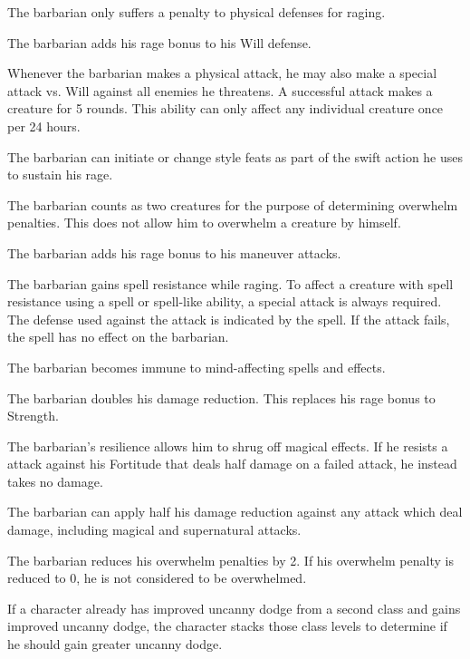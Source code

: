  The barbarian only suffers a  penalty to physical defenses for raging.

 The barbarian adds his rage bonus to his Will defense.

 Whenever the barbarian makes a physical attack, he may also make a special attack vs. Will against all enemies he threatens. A successful attack makes a creature \shaken for 5 rounds. This ability can only affect any individual creature once per 24 hours.

 The barbarian can initiate or change style feats as part of the swift action he uses to sustain his rage.

 The barbarian counts as two creatures for the purpose of determining overwhelm penalties. This does not allow him to overwhelm a creature by himself.

 The barbarian adds his rage bonus to his maneuver attacks.

 The barbarian gains spell resistance while raging. To affect a creature with spell resistance using a spell or spell-like ability, a special attack is always required. The defense used against the attack is indicated by the spell. If the attack fails, the spell has no effect on the barbarian.

 The barbarian becomes immune to mind-affecting spells and effects.

 The barbarian doubles his damage reduction. This replaces his rage bonus to Strength.

 The barbarian's resilience allows him to shrug off magical effects. If he resists a attack against his Fortitude that deals half damage on a failed attack, he instead takes no damage.

 The barbarian can apply half his damage reduction against any attack which deal damage, including magical and supernatural attacks.

 The barbarian reduces his overwhelm penalties by 2. If his overwhelm penalty is reduced to 0, he is not considered to be overwhelmed.
\par If a character already has improved uncanny dodge from a second class and gains improved uncanny dodge, the character stacks those class levels to determine if he should gain greater uncanny dodge.

